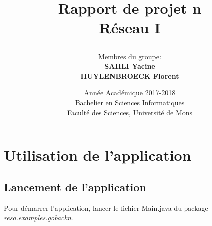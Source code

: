 \documentclass[]{article}
\begin{document}
\title{
{\Huge Rapport de projet n}\\
Réseau I\\
\author{Membres du groupe:\\
\textbf{SAHLI Yacine}\\
\textbf{HUYLENBROECK Florent}\\
}}

\date{Année Académique 2017-2018\\
Bachelier en Sciences Informatiques\\
\vspace{1cm}
Faculté des Sciences, Université de Mons}

\maketitle
\newpage
\section{Utilisation de l'application}
\subsection{Lancement de l'application}
Pour démarrer l'application, lancer le fichier Main.java du package \emph{reso.examples.gobackn}.
\end{document}
